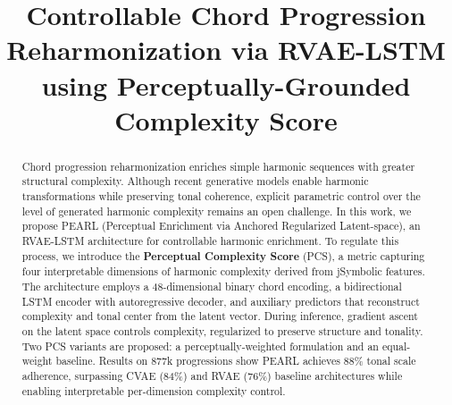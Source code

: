 \documentclass[conference]{IEEEtran}
\begin{document}
\title{Controllable Chord Progression Reharmonization via RVAE-LSTM using Perceptually-Grounded Complexity Score\\}

\author{
\and
{}
}

\maketitle

\begin{abstract}
Chord progression reharmonization enriches simple harmonic sequences with greater structural complexity. Although recent generative models enable harmonic transformations while preserving tonal coherence, explicit parametric control over the level of generated harmonic complexity remains an open challenge. In this work, we propose PEARL (Perceptual Enrichment via Anchored Regularized Latent-space), an RVAE-LSTM architecture for controllable harmonic enrichment. To regulate this process, we introduce the \textbf{Perceptual Complexity Score} (PCS), a metric capturing four interpretable dimensions of harmonic complexity derived from jSymbolic features. The architecture employs a 48-dimensional binary chord encoding, a bidirectional LSTM encoder with autoregressive decoder, and auxiliary predictors that reconstruct complexity and tonal center from the latent vector. During inference, gradient ascent on the latent space controls complexity, regularized to preserve structure and tonality. Two PCS variants are proposed: a perceptually-weighted formulation and an equal-weight baseline. Results on 877k progressions show PEARL achieves 88\% tonal scale adherence, surpassing CVAE (84\%) and RVAE (76\%) baseline architectures while enabling interpretable per-dimension complexity control.
\end{abstract}
\end{document}
